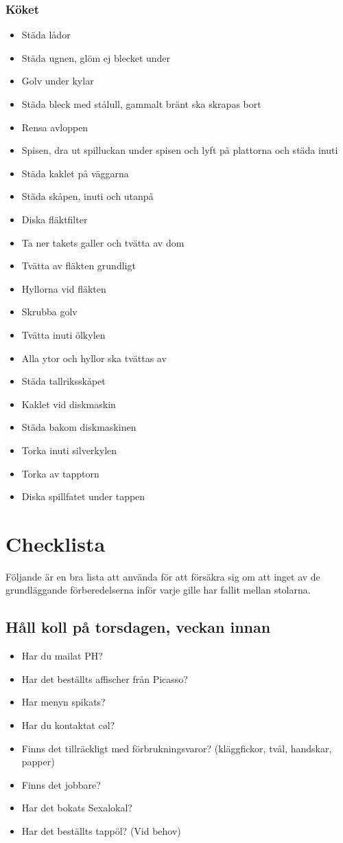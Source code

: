 \documentclass[10pt]{article}
\begin{document}
\subsubsection*{Köket}
\begin{itemize}
	\item Städa lådor
	\item Städa ugnen, glöm ej blecket under
	\item Golv under kylar
	\item Städa bleck med stålull, gammalt bränt ska skrapas bort
	\item Rensa avloppen
	\item Spisen, dra ut spilluckan under spisen och lyft på plattorna och städa inuti
	\item Städa kaklet på väggarna
	\item Städa skåpen, inuti och utanpå
	\item Diska fläktfilter
    \item Ta ner takets galler och tvätta av dom
	\item Tvätta av fläkten grundligt
	\item Hyllorna vid fläkten
	\item Skrubba golv
	\item Tvätta inuti ölkylen
	\item Alla ytor och hyllor ska tvättas av
	\item Städa tallriksskåpet
	\item Kaklet vid diskmaskin
	\item Städa bakom diskmaskinen
	\item Torka inuti silverkylen
	\item Torka av tapptorn
	\item Diska spillfatet under tappen
\end{itemize}

\newpage
\section{Checklista}
Följande är en bra lista att använda för att försäkra sig om att inget av de grundläggande förberedelserna inför varje gille har fallit mellan stolarna.

\subsection*{Håll koll på torsdagen, veckan innan}
\begin{itemize}
    \item Har du mailat PH?
    \item Har det beställts affischer från Picasso?
    \item Har menyn spikats?
    \item Har du kontaktat cøl?
    \item Finns det tillräckligt med förbrukningsvaror? (kläggfickor, tvål, handskar, 		papper)
    \item Finns det jobbare?
    \item Har det bokats Sexalokal?
    \item Har det beställts tappöl? (Vid behov)
\end{itemize}
\end{document}
